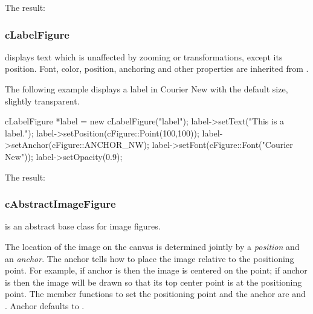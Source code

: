 
The result:

\begin{center}

\end{center}


\subsubsection{cLabelFigure}
\label{sec:graphics:labelfigure}

 displays text which is unaffected by zooming or
transformations, except its position. Font, color, position, anchoring and
other properties are inherited from .

The following example displays a label in Courier New with the default
size, slightly transparent.

\begin{cpp}
cLabelFigure *label = new cLabelFigure("label");
label->setText("This is a label.");
label->setPosition(cFigure::Point(100,100));
label->setAnchor(cFigure::ANCHOR_NW);
label->setFont(cFigure::Font("Courier New"));
label->setOpacity(0.9);
\end{cpp}


The result:

\begin{center}

\end{center}


\subsubsection{cAbstractImageFigure}
\label{sec:graphics:abstractimagefigure}

 is an abstract base class for image figures.

The location of the image on the canvas is determined jointly by a
\textit{position} and an \textit{anchor}. The anchor tells how to
place the image relative to the positioning point. For example,
if anchor is  then the image is centered on the point;
if anchor is  then the image will be drawn so that its top
center point is at the positioning point. The member functions to set the
positioning point and the anchor are  and
. Anchor defaults to .


